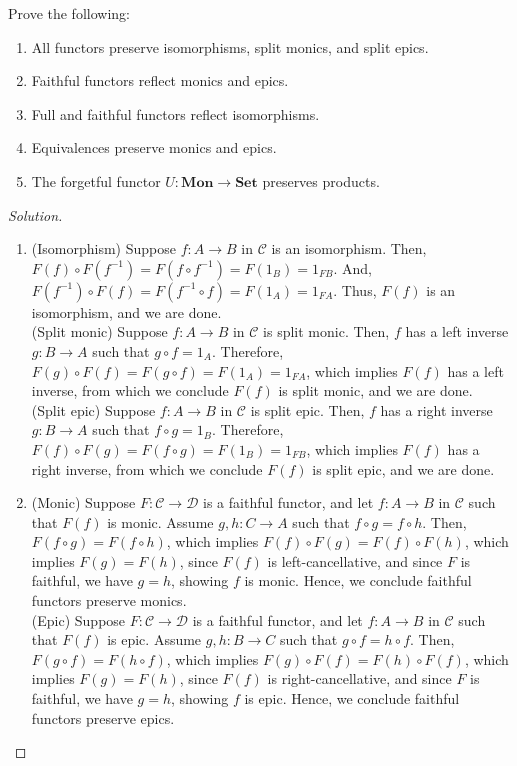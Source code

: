 \documentclass[]{amsbook}
\newcommand{\catname}[1]{\mathbf{#1}}
\newcommand{\0}{\mathbf{0}}
\newcommand{\1}{\mathbf{1}}
\newcommand{\mc}[1]{\mathcal{#1}}
\newenvironment{solution}
    {\begin{proof}[Solution]}{\end{proof}}
\begin{document}
\setcounter{Exercise}{48}
\begin{Exercise}
Prove the following:
\begin{enumerate}
    \item All functors preserve isomorphisms, split monics, and split epics.
    \item Faithful functors reflect monics and epics.
    \item Full and faithful functors reflect isomorphisms.
    \item Equivalences preserve monics and epics.
    \item The forgetful functor $U: \catname{Mon} \to \catname{Set}$ preserves
    products.
\end{enumerate}
\end{Exercise}
\begin{solution}
\leavevmode
\begin{enumerate}
    \item (Isomorphism) Suppose $f: A \to B$ in $\mc{C}$ is an isomorphism.
    Then, $F(f) \circ F(f^{-1}) = F(f \circ f^{-1}) = F(1_B) = 1_{FB}$. And,
    $F(f^{-1}) \circ F(f) = F(f^{-1} \circ f) = F(1_A) = 1_{FA}$. Thus, $F(f)$
    is an isomorphism, and we are done.\\
    (Split monic) Suppose $f: A \to B$ in $\mc{C}$ is split monic. Then, $f$
    has a left inverse $g: B \to A$ such that $g \circ f = 1_A$. Therefore,
    $F(g) \circ F(f) = F(g \circ f) = F(1_A) = 1_{FA}$, which implies $F(f)$
    has a left inverse, from which we conclude $F(f)$ is split monic, and we
    are done.\\
    (Split epic) Suppose $f: A \to B$ in $\mc{C}$ is split epic. Then, $f$
    has a right inverse $g: B \to A$ such that $f \circ g = 1_B$. Therefore,
    $F(f) \circ F(g) = F(f \circ g) = F(1_B) = 1_{FB}$, which implies $F(f)$
    has a right inverse, from which we conclude $F(f)$ is split epic, and we
    are done.

    \item (Monic) Suppose $F: \mc{C} \to \mc{D}$ is a faithful functor, and let
    $f: A \to B$ in $\mc{C}$ such that $F(f)$ is monic. Assume $g, h: C \to A$
    such that $f \circ g = f \circ h$. Then, $F(f \circ g) = F(f \circ h)$,
    which implies $F(f) \circ F(g) = F(f) \circ F(h)$, which implies $F(g) =
    F(h)$, since $F(f)$ is left-cancellative, and since $F$ is faithful, we
    have $g = h$, showing $f$ is monic. Hence, we conclude faithful functors
    preserve monics.\\
    (Epic) Suppose $F: \mc{C} \to \mc{D}$ is a faithful functor, and let
    $f: A \to B$ in $\mc{C}$ such that $F(f)$ is epic. Assume $g, h: B \to C$
    such that $g \circ f = h \circ f$. Then, $F(g \circ f) = F(h \circ f)$,
    which implies $F(g) \circ F(f) = F(h) \circ F(f)$, which implies $F(g) =
    F(h)$, since $F(f)$ is right-cancellative, and since $F$ is faithful, we
    have $g = h$, showing $f$ is epic. Hence, we conclude faithful functors
    preserve epics.


\end{enumerate}
\end{solution}
\end{document}
